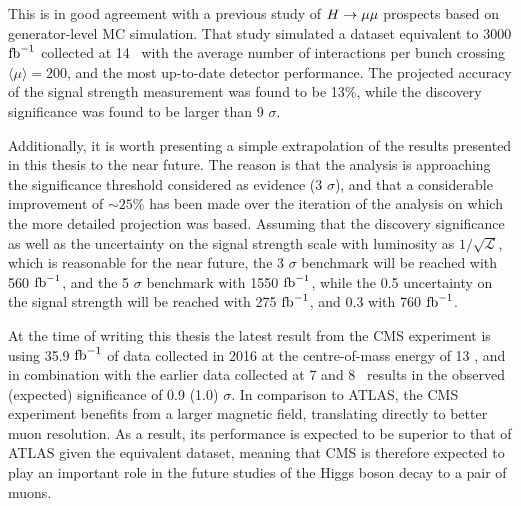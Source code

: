 This is in good agreement with a previous study of $H \rightarrow \mu\mu$ prospects
\cite{ATL-PHYS-PUB-2018-006} based on generator-level MC simulation.
That study simulated a dataset equivalent to 3000 $\text{fb}^{-1}$ collected at 14
\TeV~with the average number of interactions per bunch crossing
$\langle \mu \rangle = 200$, and the most up-to-date detector performance.
The projected accuracy of the signal strength measurement was found to
be 13\%, while the discovery significance was found to be larger than
9 $\sigma$.

Additionally, it is worth presenting a simple extrapolation of the results
presented in this thesis to the near future. The reason is that the
analysis is approaching the significance threshold considered as 
evidence (3 $\sigma$), and that a considerable improvement of $\sim 25\%$
has been made over the iteration of the analysis on which the more detailed
projection was based. Assuming that the discovery significance as well as the
uncertainty on the signal strength scale with luminosity as
$1/\sqrt{\mathcal{L}}$, which is reasonable for the near future,
the 3 $\sigma$ benchmark will be reached with 560 $\text{fb}^{-1}$, and the 5 $\sigma$
benchmark with 1550 $\text{fb}^{-1}$, while the 0.5 uncertainty on the signal strength
will be reached with 275 $\text{fb}^{-1}$, and 0.3 with 760 $\text{fb}^{-1}$.

At the time of writing this thesis the latest result from the CMS experiment
is using 35.9 $\text{fb}^{-1}$ of data collected in 2016 at the centre-of-mass energy
of 13 \TeV, and in combination with the earlier data collected at 7 and 8 \TeV~results
in the observed (expected) significance of 0.9 (1.0) $\sigma$.
In comparison to ATLAS, the CMS experiment benefits from a larger
magnetic field, translating directly to better muon resolution.
As a result, its performance is expected to be superior to that of ATLAS
given the equivalent dataset, meaning that CMS is therefore expected to play an
important role in the future studies of the Higgs boson decay to a pair
of muons.






